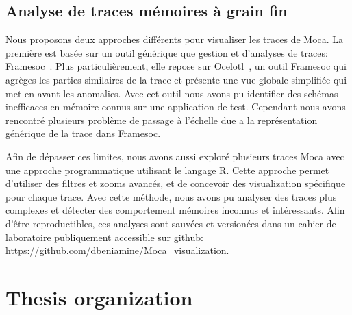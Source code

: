 \subsection*{Analyse de traces mémoires à grain fin}

Nous proposons deux approches différents pour visualiser les traces de \gls{Moca}.
La première est basée sur un outil générique que gestion et d'analyses de traces: \gls{Framesoc}~\cite{Pagano14frameSoC}.
Plus particulièrement, elle repose sur \gls{Ocelotl}~\cite{Dosimont14Ocelotl}, un outil \gls{Framesoc} qui agrèges les parties similaires de la trace et présente une vue globale simplifiée qui met en avant les anomalies.
Avec cet outil nous avons pu identifier des schémas inefficaces en mémoire connus sur une application de test.
Cependant nous avons rencontré plusieurs problème de passage à l'échelle due a la représentation générique de la trace dans \gls{Framesoc}.

Afin de dépasser ces limites, nous avons aussi exploré plusieurs traces \gls{Moca} avec une approche programmatique utilisant le langage \gls{R}.
Cette approche permet d'utiliser des filtres et zooms avancés, et de concevoir des visualization spécifique pour chaque trace.
Avec cette méthode, nous avons pu analyser des traces plus complexes et détecter des comportement mémoires inconnus et intéressants.
Afin d'être reproductibles, ces analyses sont sauvées et versionées dans un cahier de laboratoire publiquement accessible sur github:
\url{https://github.com/dbeniamine/Moca_visualization}.

\section*{Thesis organization}

